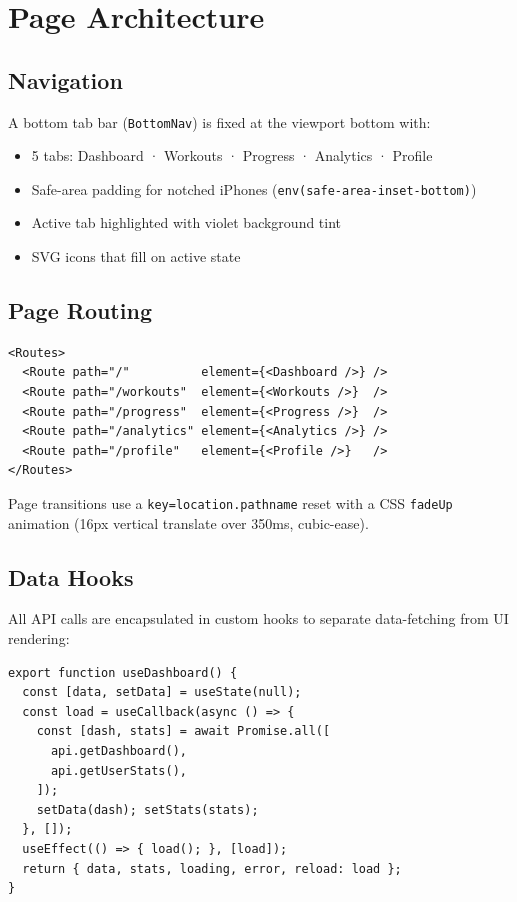 \documentclass[12pt,a4paper]{report}
\begin{document}
\section{Page Architecture}

\subsection{Navigation}

A bottom tab bar (\texttt{BottomNav}) is fixed at the viewport bottom with:
\begin{itemize}
  \item 5 tabs: Dashboard · Workouts · Progress · Analytics · Profile
  \item Safe-area padding for notched iPhones (\texttt{env(safe-area-inset-bottom)})
  \item Active tab highlighted with violet background tint
  \item SVG icons that fill on active state
\end{itemize}

\subsection{Page Routing}

\begin{lstlisting}[caption=App.js routing structure]
<Routes>
  <Route path="/"          element={<Dashboard />} />
  <Route path="/workouts"  element={<Workouts />}  />
  <Route path="/progress"  element={<Progress />}  />
  <Route path="/analytics" element={<Analytics />} />
  <Route path="/profile"   element={<Profile />}   />
</Routes>
\end{lstlisting}

Page transitions use a \texttt{key={location.pathname}} reset with a CSS
\texttt{fadeUp} animation (16px vertical translate over 350ms, cubic-ease).

\subsection{Data Hooks}

All API calls are encapsulated in custom hooks to separate data-fetching
from UI rendering:

\begin{lstlisting}[caption=useDashboard hook]
export function useDashboard() {
  const [data, setData] = useState(null);
  const load = useCallback(async () => {
    const [dash, stats] = await Promise.all([
      api.getDashboard(),
      api.getUserStats(),
    ]);
    setData(dash); setStats(stats);
  }, []);
  useEffect(() => { load(); }, [load]);
  return { data, stats, loading, error, reload: load };
}
\end{lstlisting}
\end{document}
